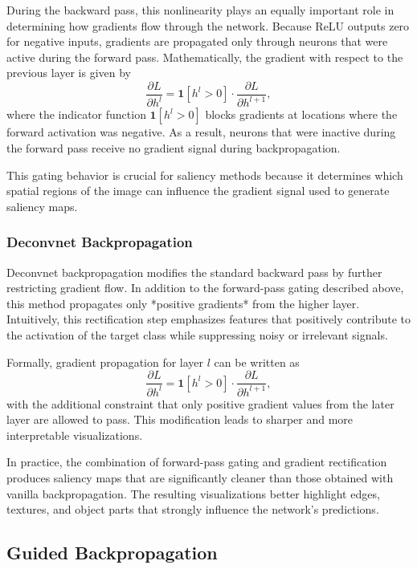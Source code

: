 \documentclass{article}
\begin{document}
During the backward pass, this nonlinearity plays an equally important role in determining how gradients flow through the network. Because ReLU outputs zero for negative inputs, gradients are propagated only through neurons that were active during the forward pass. Mathematically, the gradient with respect to the previous layer is given by
\[
\frac{\partial L}{\partial h^l}
= \mathbf{1}[h^l > 0] \cdot \frac{\partial L}{\partial h^{l+1}},
\]
where the indicator function $\mathbf{1}[h^l > 0]$ blocks gradients at locations where the forward activation was negative. As a result, neurons that were inactive during the forward pass receive no gradient signal during backpropagation.

This gating behavior is crucial for saliency methods because it determines which spatial regions of the image can influence the gradient signal used to generate saliency maps.

\subsubsection{Deconvnet Backpropagation}

Deconvnet backpropagation modifies the standard backward pass by further restricting gradient flow. In addition to the forward-pass gating described above, this method propagates only *positive gradients* from the higher layer. Intuitively, this rectification step emphasizes features that positively contribute to the activation of the target class while suppressing noisy or irrelevant signals.

Formally, gradient propagation for layer $l$ can be written as
\[
\frac{\partial L}{\partial h^l}
= \mathbf{1}[h^l > 0] \cdot \frac{\partial L}{\partial h^{l+1}},
\]
with the additional constraint that only positive gradient values from the later layer are allowed to pass. This modification leads to sharper and more interpretable visualizations.

In practice, the combination of forward-pass gating and gradient rectification produces saliency maps that are significantly cleaner than those obtained with vanilla backpropagation. The resulting visualizations better highlight edges, textures, and object parts that strongly influence the network’s predictions.

\subsection{Guided Backpropagation}
\end{document}
